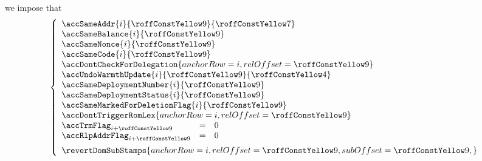 \item[\underline{\underline{Account-row $n^°(i + \callThirdCalleeAccountRowOffset)$:}}]
	we impose that
	\[
		\left\{ \begin{array}{lcl}
			\multicolumn{3}{l}{\accSameAddr                 {i}{\callThirdCalleeAccountRowOffset}{\callSecondCalleeAccountRowOffset}} \\
			\multicolumn{3}{l}{\accSameBalance              {i}{\callThirdCalleeAccountRowOffset}} \\
			\multicolumn{3}{l}{\accSameNonce                {i}{\callThirdCalleeAccountRowOffset}} \\
			\multicolumn{3}{l}{\accSameCode                 {i}{\callThirdCalleeAccountRowOffset}} \\
			\multicolumn{3}{l}{\accDontCheckForDelegation   { anchorRow = i, relOffset = \callThirdCalleeAccountRowOffset }} \\
			\multicolumn{3}{l}{\accUndoWarmthUpdate         {i}{\callThirdCalleeAccountRowOffset}{\callFirstCalleeAccountRowOffset}} \\
			\multicolumn{3}{l}{\accSameDeploymentNumber     {i}{\callThirdCalleeAccountRowOffset}} \\
			\multicolumn{3}{l}{\accSameDeploymentStatus     {i}{\callThirdCalleeAccountRowOffset}} \\
			\multicolumn{3}{l}{\accSameMarkedForDeletionFlag {i}{\callThirdCalleeAccountRowOffset}} \\
			\multicolumn{3}{l}{\accDontTriggerRomLex        { anchorRow = i, relOffset = \callThirdCalleeAccountRowOffset }} \\
			\accTrmFlag      _{i + \callThirdCalleeAccountRowOffset} & = & 0 \\
			\accRlpAddrFlag  _{i + \callThirdCalleeAccountRowOffset} & = & 0 \vspace{2mm} \\
			\multicolumn{3}{l}{
				\revertDomSubStamps {
					anchorRow = i                                ,
					relOffset = \callThirdCalleeAccountRowOffset ,
					subOffset = \callThirdCalleeAccountRowOffset ,
				}
			} \\
		\end{array} \right.
	\]
